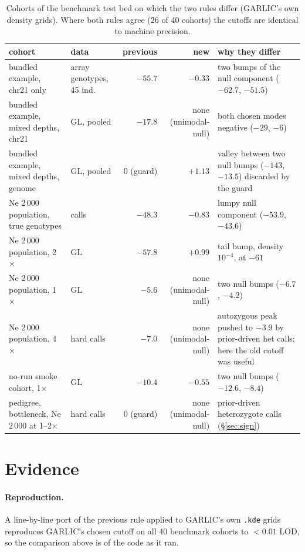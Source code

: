 \documentclass[11pt]{article}
\newcommand{\code}[1]{\texttt{#1}}
\begin{document}
\begin{table}[h]\centering\footnotesize
\caption{Cohorts of the benchmark test bed on which the two rules differ (GARLIC's own density grids). Where both rules agree (26 of 40 cohorts) the cutoffs are identical to machine precision.}
\label{tab:cases}
\begin{tabular}{p{}p{}rrp{}}
\toprule
cohort & data & previous & new & why they differ \\
\midrule
bundled example, chr21 only & array genotypes, 45 ind. & $-55.7$ & $-0.33$ & two bumps of the null component ($-62.7$, $-51.5$) \\
bundled example, mixed depths, chr21 & GL, pooled & $-17.8$ & none (unimodal-null) & both chosen modes negative ($-29$, $-6$) \\
bundled example, mixed depths, genome & GL, pooled & 0 (guard) & $+1.13$ & valley between two null bumps ($-143$, $-13.5$) discarded by the guard \\
Ne 2\,000 population, true genotypes & calls & $-48.3$ & $-0.83$ & lumpy null component ($-53.9$, $-43.6$) \\
Ne 2\,000 population, 2$\times$ & GL & $-57.8$ & $+0.99$ & tail bump, density $10^{-4}$, at $-61$ \\
Ne 2\,000 population, 1$\times$ & GL & $-5.6$ & none (unimodal-null) & two null bumps ($-6.7$, $-4.2$) \\
Ne 2\,000 population, 4$\times$ & hard calls & $-7.0$ & none (unimodal-null) & autozygous peak pushed to $-3.9$ by prior-driven het calls; here the old cutoff was useful \\
no-run smoke cohort, 1$\times$ & GL & $-10.4$ & $-0.55$ & two null bumps ($-12.6$, $-8.4$) \\
pedigree, bottleneck, Ne 2\,000 at 1--2$\times$ & hard calls & 0 (guard) & none (unimodal-null) & prior-driven heterozygote calls (\S\ref{sec:sign}) \\
\bottomrule
\end{tabular}
\end{table}

\section{Evidence}

\paragraph{Reproduction.} A line-by-line port of the previous rule applied to GARLIC's own \code{.kde} grids reproduces GARLIC's chosen cutoff on all 40 benchmark cohorts to $<0.01$ LOD, so the comparison above is of the code as it ran.
\end{document}
